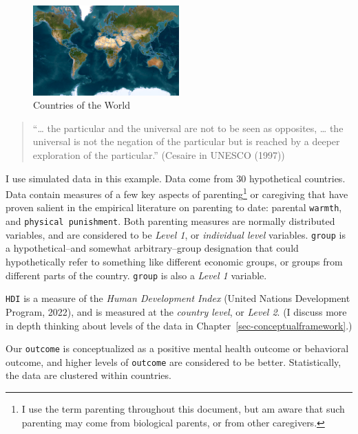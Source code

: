 \documentclass[
  letterpaper,
  DIV=11,
  numbers=noendperiod]{scrreprt}
\begin{document}
\begin{figure}

{\centering \includegraphics[width=0.5\textwidth,height=\textheight]{world.png}

}

\caption{\label{fig-world}Countries of the World}

\end{figure}

\begin{quote}
``\ldots{} the particular and the universal are not to be seen as
opposites, \ldots{} the universal is not the negation of the particular
but is reached by a deeper exploration of the particular.'' (Cesaire in
UNESCO (1997))
\end{quote}

I use simulated data in this example. Data come from 30 hypothetical
countries. Data contain measures of a few key aspects of
parenting\footnote{I use the term parenting throughout this document,
  but am aware that such parenting may come from biological parents, or
  from other caregivers.} or caregiving that have proven salient in the
empirical literature on parenting to date: parental \texttt{warmth}, and
\texttt{physical\ punishment}. Both parenting measures are normally
distributed variables, and are considered to be \emph{Level 1}, or
\emph{individual level} variables. \texttt{group} is a hypothetical--and
somewhat arbitrary--group designation that could hypothetically refer to
something like different economic groups, or groups from different parts
of the country. \texttt{group} is also a \emph{Level 1} variable.

\texttt{HDI} is a measure of the \emph{Human Development Index} (United
Nations Development Program, 2022), and is measured at the \emph{country
level}, or \emph{Level 2}. (I discuss more in depth thinking about
levels of the data in Chapter~\ref{sec-conceptualframework}.)

Our \texttt{outcome} is conceptualized as a positive mental health
outcome or behavioral outcome, and higher levels of \texttt{outcome} are
considered to be better. Statistically, the data are clustered within
countries.
\end{document}
